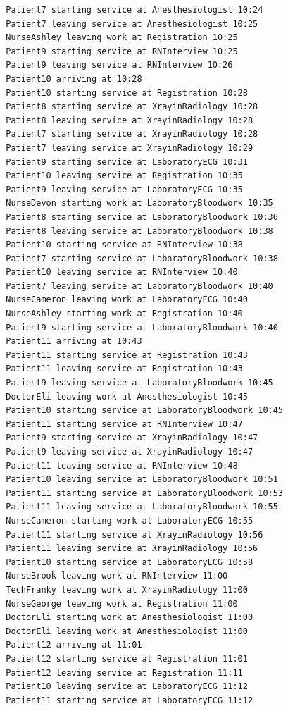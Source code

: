 \documentclass[12pt]{article}
\begin{document}
\begin{verbatim}
		Patient7 starting service at Anesthesiologist 10:24
		Patient7 leaving service at Anesthesiologist 10:25
		NurseAshley leaving work at Registration 10:25
		Patient9 starting service at RNInterview 10:25
		Patient9 leaving service at RNInterview 10:26
		Patient10 arriving at 10:28
		Patient10 starting service at Registration 10:28
		Patient8 starting service at XrayinRadiology 10:28
		Patient8 leaving service at XrayinRadiology 10:28
		Patient7 starting service at XrayinRadiology 10:28
		Patient7 leaving service at XrayinRadiology 10:29
		Patient9 starting service at LaboratoryECG 10:31
		Patient10 leaving service at Registration 10:35
		Patient9 leaving service at LaboratoryECG 10:35
		NurseDevon starting work at LaboratoryBloodwork 10:35
		Patient8 starting service at LaboratoryBloodwork 10:36
		Patient8 leaving service at LaboratoryBloodwork 10:38
		Patient10 starting service at RNInterview 10:38
		Patient7 starting service at LaboratoryBloodwork 10:38
		Patient10 leaving service at RNInterview 10:40
		Patient7 leaving service at LaboratoryBloodwork 10:40
		NurseCameron leaving work at LaboratoryECG 10:40
		NurseAshley starting work at Registration 10:40
		Patient9 starting service at LaboratoryBloodwork 10:40
		Patient11 arriving at 10:43
		Patient11 starting service at Registration 10:43
		Patient11 leaving service at Registration 10:43
		Patient9 leaving service at LaboratoryBloodwork 10:45
		DoctorEli leaving work at Anesthesiologist 10:45
		Patient10 starting service at LaboratoryBloodwork 10:45
		Patient11 starting service at RNInterview 10:47
		Patient9 starting service at XrayinRadiology 10:47
		Patient9 leaving service at XrayinRadiology 10:47
		Patient11 leaving service at RNInterview 10:48
		Patient10 leaving service at LaboratoryBloodwork 10:51
		Patient11 starting service at LaboratoryBloodwork 10:53
		Patient11 leaving service at LaboratoryBloodwork 10:55
		NurseCameron starting work at LaboratoryECG 10:55
		Patient11 starting service at XrayinRadiology 10:56
		Patient11 leaving service at XrayinRadiology 10:56
		Patient10 starting service at LaboratoryECG 10:58
		NurseBrook leaving work at RNInterview 11:00
		TechFranky leaving work at XrayinRadiology 11:00
		NurseGeorge leaving work at Registration 11:00
		DoctorEli starting work at Anesthesiologist 11:00
		DoctorEli leaving work at Anesthesiologist 11:00
		Patient12 arriving at 11:01
		Patient12 starting service at Registration 11:01
		Patient12 leaving service at Registration 11:11
		Patient10 leaving service at LaboratoryECG 11:12
		Patient11 starting service at LaboratoryECG 11:12

\end{verbatim}
\end{document}
